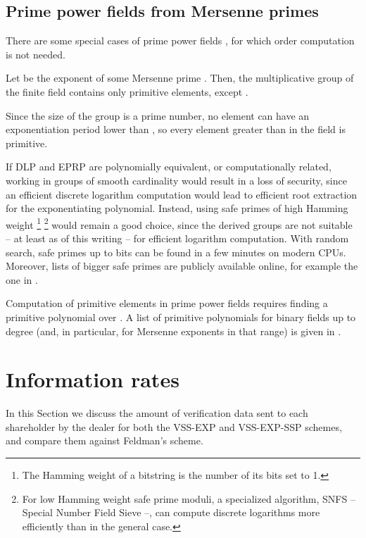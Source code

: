 \documentclass[10pt,journal,cspaper,compsoc]{IEEEtran}
\begin{document}
\subsection{Prime power fields from Mersenne primes}
There are some special cases of prime power fields , for which order computation is not needed.
\begin{lem}
Let  be the exponent of some Mersenne prime . Then, the multiplicative group  of the finite field  contains only primitive elements, except .
\end{lem}
\begin{IEEEproof}
Since the size of the group is a prime number, no element can have an exponentiation period lower than , so every element greater than  in the field is primitive.
\end{IEEEproof}




\begin{rem}
If DLP and EPRP are polynomially equivalent, or computationally related, working in groups of smooth cardinality would result in a loss of security, since an efficient discrete logarithm computation would lead to efficient root extraction for the exponentiating polynomial. Instead, using safe primes of high Hamming weight \footnote{The Hamming weight of a bitstring is the number of its bits set to 1.} \footnote{For low Hamming weight safe prime moduli, a specialized algorithm, SNFS -- Special Number Field Sieve --, can compute discrete logarithms more efficiently than in the general case.} would remain a good choice, since the derived groups are not suitable -- at least as of this writing -- for efficient logarithm computation.
With random search, safe primes up to  bits can be found in a few minutes on modern CPUs. Moreover, lists of bigger safe primes are publicly available online, for example the one in \cite{rfc3526}.
\end{rem}

\begin{rem}
Computation of primitive elements in prime power
fields  requires finding a primitive polynomial
over .
A list of primitive polynomials for
binary fields  up to degree 
(and, in particular, for Mersenne exponents in that range)
is given in \cite{Zivkovic:1994:TPB:179653.179706}.
\end{rem}

\section{Information rates}
\label{comparison-section}
In this Section we discuss the amount of verification data sent to each shareholder by the dealer for both the VSS-EXP and VSS-EXP-SSP schemes, and compare them against Feldman's scheme.
\end{document}
